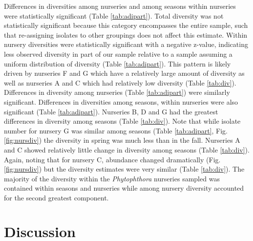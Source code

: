 \documentclass[12pt]{article}
\begin{document}
Differences in diversities among nurseries and among seasons within nurseries were statistically significant (Table \ref{tab:adipart}).  Total diversity was not statistically significant because this category encompasses the entire sample, such that re-assigning isolates to other groupings does not affect this estimate.  Within nursery diversities were statistically significant with a negative z-value, indicating less observed diversity in part of our sample relative to a sample assuming a uniform distribution of diversity (Table \ref{tab:adipart}).  This pattern is likely driven by nurseries F and G which have a relatively large amount of diversity as well as nurseries A and C which had relatively low diversity (Table \ref{tab:div}).  Differences in diversity among nurseries (Table \ref{tab:adipart}) were similarly significant.  Differences in diversities among seasons, within nurseries were also significant (Table \ref{tab:adipart}).  Nurseries B, D and G had the greatest differences in diversity among seasons (Table \ref{tab:div}).  Note that while isolate number for nursery G was similar among seasons (Table \ref{tab:adipart}, Fig. \ref{fig:nursdiv}) the diversity in spring was much less than in the fall.  Nurseries A and C showed relatively little change in diversity among seasons (Table \ref{tab:div}).  Again, noting that for nursery C, abundance changed dramatically (Fig. \ref{fig:nursdiv}) but the diversity estimates were very similar (Table \ref{tab:div}).  The majority of the diversity within the \emph{Phytophthora} nurseries sampled was contained within seasons and nurseries while among nursery diversity accounted for the second greatest component.




\section*{\sffamily\normalsize{Discussion}}

\end{document}
